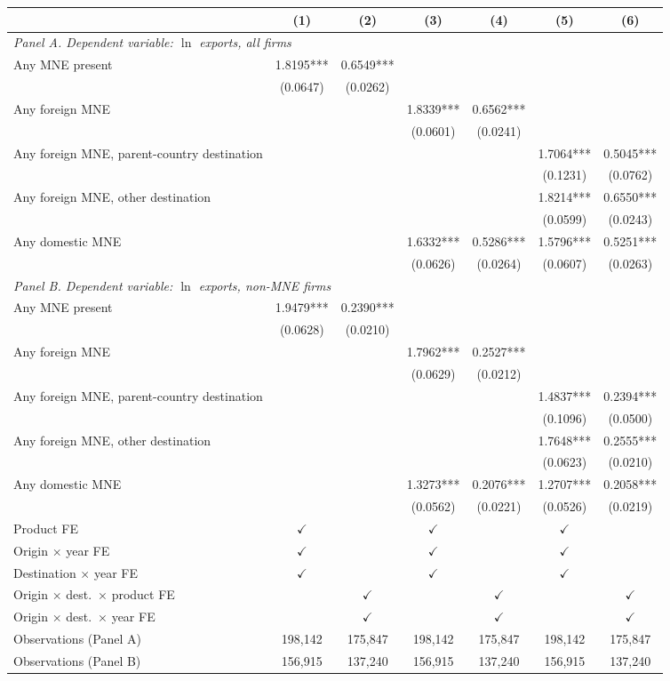 \begin{tabular}{lcccccc} \hline
 & (1) & (2) & (3) & (4) & (5) & (6) \\ \hline
\multicolumn{7}{l}{\textit{Panel A. Dependent variable: $\ln$ exports, all firms}} \\
Any MNE present & 1.8195*** & 0.6549*** &  &  &  &  \\
 & (0.0647) & (0.0262) &  &  &  &  \\
Any foreign MNE &  &  & 1.8339*** & 0.6562*** &  &  \\
 &  &  & (0.0601) & (0.0241) &  &  \\
Any foreign MNE, parent-country destination &  &  &  &  & 1.7064*** & 0.5045*** \\
 &  &  &  &  & (0.1231) & (0.0762) \\
Any foreign MNE, other destination &  &  &  &  & 1.8214*** & 0.6550*** \\
 &  &  &  &  & (0.0599) & (0.0243) \\
Any domestic MNE &  &  & 1.6332*** & 0.5286*** & 1.5796*** & 0.5251*** \\
 &  &  & (0.0626) & (0.0264) & (0.0607) & (0.0263) \\
\midrule
\multicolumn{7}{l}{\textit{Panel B. Dependent variable: $\ln$ exports, non-MNE firms}} \\
Any MNE present & 1.9479*** & 0.2390*** &  &  &  &  \\
 & (0.0628) & (0.0210) &  &  &  &  \\
Any foreign MNE &  &  & 1.7962*** & 0.2527*** &  &  \\
 &  &  & (0.0629) & (0.0212) &  &  \\
Any foreign MNE, parent-country destination &  &  &  &  & 1.4837*** & 0.2394*** \\
 &  &  &  &  & (0.1096) & (0.0500) \\
Any foreign MNE, other destination &  &  &  &  & 1.7648*** & 0.2555*** \\
 &  &  &  &  & (0.0623) & (0.0210) \\
Any domestic MNE &  &  & 1.3273*** & 0.2076*** & 1.2707*** & 0.2058*** \\
 &  &  & (0.0562) & (0.0221) & (0.0526) & (0.0219) \\
\hline
Product FE & $\checkmark$ &  & $\checkmark$ &  & $\checkmark$ &  \\
Origin $\times$ year FE & $\checkmark$ &  & $\checkmark$ &  & $\checkmark$ &  \\
Destination $\times$ year FE & $\checkmark$ &  & $\checkmark$ &  & $\checkmark$ &  \\
Origin $\times$ dest.\ $\times$ product FE &  & $\checkmark$ &  & $\checkmark$ &  & $\checkmark$ \\
Origin $\times$ dest.\ $\times$ year FE &  & $\checkmark$ &  & $\checkmark$ &  & $\checkmark$ \\
Observations (Panel A) & 198,142 & 175,847 & 198,142 & 175,847 & 198,142 & 175,847 \\
Observations (Panel B) & 156,915 & 137,240 & 156,915 & 137,240 & 156,915 & 137,240 \\
\hline
\end{tabular}
